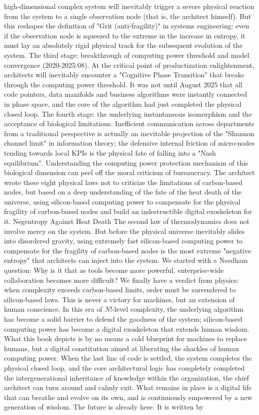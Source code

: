 \documentclass[11pt,a4paper]{article}
\begin{document}
high-dimensional complex system will inevitably trigger a severe physical reaction from the system to a single observation node (that is, the architect himself). But this reshapes the definition of "Grit (anti-fragility)" in systems engineering: even if the observation node is squeezed to the extreme in the increase in entropy, it must lay an absolutely rigid physical track for the subsequent evolution of the system. The third stage: breakthrough of computing power threshold and model convergence (2020-2025.08). At the critical point of productization enlightenment, architects will inevitably encounter a "Cognitive Phase Transition" that breaks through the computing power threshold. It was not until August 2025 that all code pointers, data manifolds and business algorithms were instantly connected in phase space, and the core of the algorithm had just completed the physical closed loop. The fourth stage: the underlying instantaneous isomorphism and the acceptance of biological limitations. Inefficient communication across departments from a traditional perspective is actually an inevitable projection of the "Shannon channel limit" in information theory; the defensive internal friction of micro-nodes tending towards local KPIs is the physical fate of falling into a "Nash equilibrium". Understanding the computing power protection mechanism of this biological dimension can peel off the moral criticism of bureaucracy. The architect wrote these eight physical laws not to criticize the limitations of carbon-based nodes, but based on a deep understanding of the fate of the heat death of the universe, using silicon-based computing power to compensate for the physical fragility of carbon-based nodes and build an indestructible digital exoskeleton for it. Negentropy Against Heat Death The second law of thermodynamics does not involve mercy on the system. But before the physical universe inevitably slides into disordered gravity, using extremely fast silicon-based computing power to compensate for the fragility of carbon-based nodes is the most extreme "negative entropy" that architects can inject into the system. We started with a Needham question: Why is it that as tools become more powerful, enterprise-wide collaboration becomes more difficult? We finally have a verdict from physics: when complexity exceeds carbon-based limits, order must be surrendered to silicon-based laws. This is never a victory for machines, but an extension of human conscience. In this era of $N!$-level complexity, the underlying algorithm has become a solid barrier to defend the goodness of the system; silicon-based computing power has become a digital exoskeleton that extends human wisdom. What this book depicts is by no means a cold blueprint for machines to replace humans, but a digital constitution aimed at liberating the shackles of human computing power. When the last line of code is settled, the system completes the physical closed loop, and the core architectural logic has completely completed the intergenerational inheritance of knowledge within the organization, the chief architect can turn around and calmly exit. What remains in place is a digital life that can breathe and evolve on its own, and is continuously empowered by a new generation of wisdom. The future is already here. It is written by 
\end{document}
